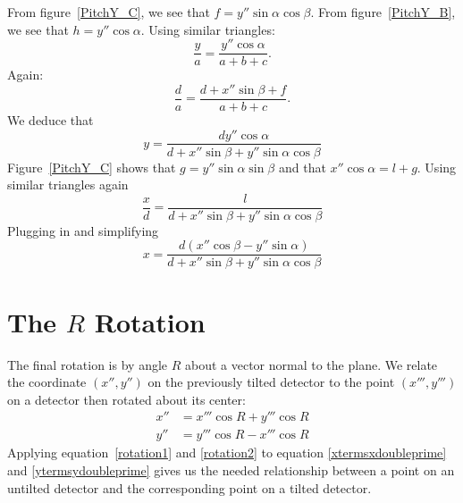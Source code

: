 \begin{SCfigure}[1][bthp]
    \centering
     
    \label{PitchY_A}
    \caption{A diagram of a plane that has been 
    rotate by angle $\beta$ about the $\hat y$ axis 
    and then by $\alpha$ about the $\hat x'$ axis.}
\end{SCfigure}

\begin{SCfigure}[1][bthp]
    \centering
     
    \label{PitchY_B}
    \caption{A more geometrical diagram
    of figure~\ref{PitchY_A}.}
\end{SCfigure}

\begin{SCfigure}[1][bthp]
    \centering
     
    \label{PitchY_C}
    \caption{A cross section of the $y=0$ plane.}

\end{SCfigure}

From figure~\ref{PitchY_C}, we see  
that $f=y''\sin\alpha\cos\beta$. From figure~\ref{PitchY_B},
we see that $h=y''\cos\alpha$. Using similar
triangles:
\begin{equation}
    \frac{y}{a} = \frac{y''\cos\alpha}{a+b+c}.
\end{equation}
Again:
\begin{equation}
    \frac{d}{a} = \frac{d+x''\sin\beta+f}{a+b+c}.
\end{equation}
We deduce that
\begin{equation}\label{ytermsydoubleprime}
    \boxed{y=\frac{dy''\cos\alpha}{
    d+x''\sin\beta+y''\sin\alpha\cos\beta}}
\end{equation}
Figure~\ref{PitchY_C} shows that 
$g=y''\sin\alpha\sin\beta$ and that 
$x''\cos\alpha=l+g$. Using similar triangles again 
\begin{equation}
    \frac{x}{d} = \frac{l}{d+x''\sin\beta+
    y''\sin\alpha\cos\beta}
\end{equation}
Plugging in and simplifying
\begin{equation}\label{xtermsxdoubleprime}
    \boxed{x=\frac{d(x''\cos\beta-y''\sin\alpha)}{
    d+x''\sin\beta+y''\sin\alpha\cos\beta}}
\end{equation}

\section{\texorpdfstring{The $R$ Rotation}{The R Rotation}}

The final rotation is by angle $R$ about a vector normal
to the plane. We relate the coordinate $(x'',y'')$ on the 
previously tilted detector to the point $(x''',y''')$ on 
a detector then rotated about its center:
\begin{align}
    x''&=x'''\cos R + y'''\cos R\label{rotation1}\\
    y''&=y'''\cos R - x'''\cos R\label{rotation2}
\end{align}
Applying equation~\ref{rotation1} and \ref{rotation2}
to equation \ref{xtermsxdoubleprime} and \ref{ytermsydoubleprime}
gives us the needed relationship between a point on an untilted
detector and the corresponding point on a tilted detector.

